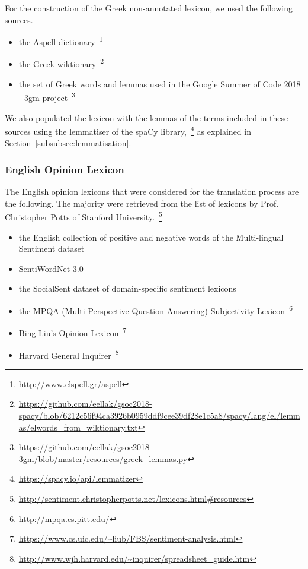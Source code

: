 For the construction of the Greek non-annotated lexicon,
we used the following sources.

\begin{itemize}
 \item the Aspell dictionary~\footnote{ \url{http://www.elspell.gr/aspell}}
 \item the Greek wiktionary~\footnote{ \url{https://github.com/eellak/gsoc2018-spacy/blob/6212c56f94ca3926b0959ddf9cee39df28e1c5a8/spacy/lang/el/lemmas/elwords_from_wiktionary.txt}}
 \item the set of Greek words and lemmas used
 in the Google Summer of Code 2018 - 3gm project~\footnote{ \url{https://github.com/eellak/gsoc2018-3gm/blob/master/resources/greek_lemmas.py}}
\end{itemize}

We also populated the lexicon with the lemmas of the terms included in these sources
using the lemmatiser of the spaCy library,~\footnote{\url{https://spacy.io/api/lemmatizer}} as explained in Section~\ref{subsubsec:lemmatisation}.

\subsubsection{English Opinion Lexicon}
\label{subsubsec:english}

The English opinion lexicons that were considered
for the translation process are the following.
The majority were retrieved from the list of lexicons by Prof. Christopher Potts
of Stanford University.~\footnote{ \url{http://sentiment.christopherpotts.net/lexicons.html#resources}}

\begin{itemize}
 \item the English collection of positive and negative words of the Multi-lingual Sentiment dataset
 \item SentiWordNet 3.0~\cite{BES10}
 \item the SocialSent dataset of domain-specific sentiment lexicons~\cite{HCLJ16}
 \item the MPQA (Multi-Perspective Question Answering) Subjectivity Lexicon~\footnote{ \url{http://mpqa.cs.pitt.edu/}}
 \item Bing Liu's Opinion Lexicon~\footnote{ \url{https://www.cs.uic.edu/~liub/FBS/sentiment-analysis.html}}
 \item Harvard General Inquirer~\footnote{ \url{http://www.wjh.harvard.edu/~inquirer/spreadsheet_guide.htm}}
\end{itemize}

